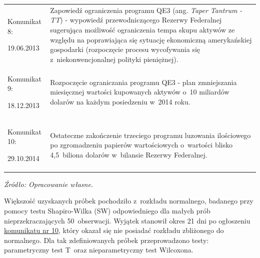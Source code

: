 \begin{table}[H]
\begin{tabular}{M{2.75cm}M{12.5cm}}
\hypertarget{kom8}{Komunikat 8:} 19.06.2013 & Zapowiedź ograniczenia programu \acs{QE}3 (ang. \textit{Taper Tantrum - TT}) - wypowiedź przewodniczącego Rezerwy Federalnej sugerująca możliwość ograniczenia tempa skupu aktywów ze względu na poprawiająca się sytuację ekonomiczną amerykańskiej gospodarki (rozpoczęcie procesu wycofywania się z~niekonwencjonalnej polityki pieniężnej).\cite{bernanke18}\\
\hypertarget{kom9}{Komunikat 9:} 18.12.2013 & Rozpoczęcie ograniczania programu \acs{QE}3 - plan zmniejszania miesięcznej wartości kupowanych aktywów o~10 miliardów dolarów na każdym posiedzeniu w~2014 roku.\cite{Fed16}\\
\hypertarget{kom10}{Komunikat 10:} 29.10.2014 & Ostateczne zakończenie trzeciego programu luzowania ilościowego po zgromadzeniu papierów wartościowych o~wartości blisko 4,5~biliona dolarów w~bilansie Rezerwy Federalnej.\cite{Fed17}\\
\bottomrule
\end{tabular}
\begin{flushleft}
\hspace{1cm}\textit{\footnotesize{Źródło: Opracowanie własne.}} \\
\end{flushleft}
\vspace{-0.5cm}
\end{table} 

Większość uzyskanych próbek pochodziło z~rozkładu normalnego, badanego przy pomocy testu Shapiro-Wilka (\acs{SW}) odpowiedniego dla małych prób nieprzekraczających 50~obserwacji. Wyjątek stanowił okres 21 dni po ogłoszeniu \hyperlink{kom10}{komunikatu nr 10}, który okazał się nie posiadać rozkładu zbliżonego do normalnego. Dla tak zdefiniowanych próbek przeprowadzono testy: parametryczny test T~oraz nieparametryczny test Wilcoxona.

